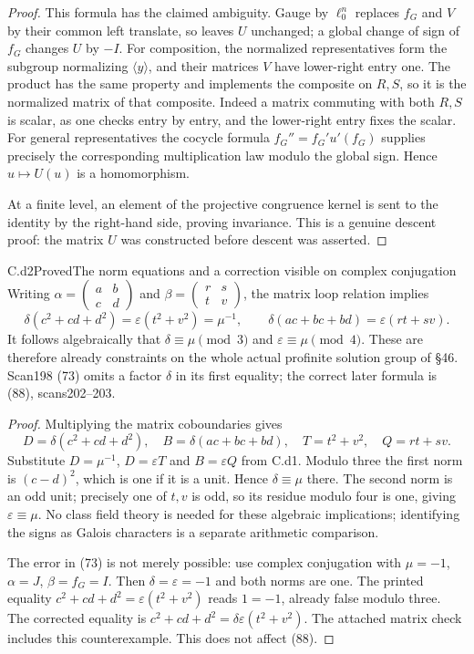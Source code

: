 \begin{proof}
This formula has the claimed ambiguity. Gauge by $\ell_0^n$ replaces $f_G$ and $V$ by their common left translate, so leaves $U$ unchanged; a global change of sign of $f_G$ changes $U$ by $-I$. For composition, the normalized representatives form the subgroup normalizing $\langle y\rangle$, and their matrices $V$ have lower-right entry one. The product has the same property and implements the composite on $R,S$, so it is the normalized matrix of that composite. Indeed a matrix commuting with both $R,S$ is scalar, as one checks entry by entry, and the lower-right entry fixes the scalar. For general representatives the cocycle formula $f_G''=f_G' u'(f_G)$ supplies precisely the corresponding multiplication law modulo the global sign. Hence $u\mapsto U(u)$ is a homomorphism.

At a finite level, an element of the projective congruence kernel is sent to the identity by the right-hand side, proving invariance. This is a genuine descent proof: the matrix $U$ was constructed before descent was asserted.
\end{proof}

\begin{claim}{C.d2}{Proved}{The norm equations and a correction visible on complex conjugation}
Writing
$\alpha=\left(\begin{smallmatrix}a&b\\c&d\end{smallmatrix}\right)$ and
$\beta=\left(\begin{smallmatrix}r&s\\t&v\end{smallmatrix}\right)$, the matrix loop relation implies
\[
 \delta(c^2+cd+d^2)=\varepsilon(t^2+v^2)=\mu^{-1},
 \qquad
 \delta(ac+bc+bd)=\varepsilon(rt+sv).
\]
It follows algebraically that $\delta\equiv\mu\pmod3$ and $\varepsilon\equiv\mu\pmod4$. These are therefore already constraints on the whole actual profinite solution group of \S46. Scan198 (73) omits a factor $\delta$ in its first equality; the correct later formula is (88), scans202--203.
\end{claim}
\begin{proof}
Multiplying the matrix coboundaries gives
\[
 D=\delta(c^2+cd+d^2),\quad
 B=\delta(ac+bc+bd),\quad
 T=t^2+v^2,\quad Q=rt+sv.
\]
Substitute $D=\mu^{-1}$, $D=\varepsilon T$ and $B=\varepsilon Q$ from C.d1. Modulo three the first norm is $(c-d)^2$, which is one if it is a unit. Hence $\delta\equiv\mu$ there. The second norm is an odd unit; precisely one of $t,v$ is odd, so its residue modulo four is one, giving $\varepsilon\equiv\mu$. No class field theory is needed for these algebraic implications; identifying the signs as Galois characters is a separate arithmetic comparison.

The error in (73) is not merely possible: use complex conjugation with $\mu=-1$, $\alpha=J$, $\beta=f_G=I$. Then $\delta=\varepsilon=-1$ and both norms are one. The printed equality $c^2+cd+d^2=\varepsilon(t^2+v^2)$ reads $1=-1$, already false modulo three. The corrected equality is $c^2+cd+d^2=\delta\varepsilon(t^2+v^2)$. The attached matrix check includes this counterexample. This does not affect (88).
\end{proof}

